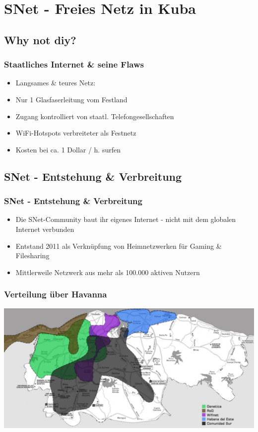 \section{SNet - Freies Netz in Kuba}
\subsection{Why not diy?}

\begin{frame}
\frametitle{Staatliches Internet \& seine Flaws}
	\begin{itemize}
		\item Langsames \& teures Netz:
		\item Nur 1 Glasfaserleitung vom Festland
		\item Zugang kontrolliert von staatl. Telefongesellschaften
		\item WiFi-Hotspots verbreiteter als Festnetz
		\item Kosten bei ca. 1 Dollar / h. surfen
	\end{itemize}
\end{frame}

\subsection{SNet - Entstehung \& Verbreitung}

\begin{frame}
\frametitle{SNet - Entstehung \& Verbreitung}
	\begin{itemize}
		\item Die SNet-Community baut ihr eigenes Internet - nicht mit dem globalen Internet verbunden
		\item Entstand 2011 als Verknüpfung von Heimnetzwerken für Gaming \& Filesharing
		\item Mittlerweile Netzwerk aus mehr als 100.000 aktiven Nutzern
	\end{itemize}
	
\end{frame}
\begin{frame}
	\frametitle{Verteilung über Havanna}
	\includegraphics[width=\textwidth]{images/havanna_net.jpg}
\end{frame}

